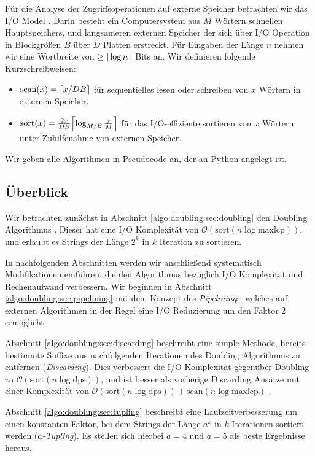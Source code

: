 Für die Analyse der Zugriffsoperationen auf externe Speicher betrachten wir das I/O Model \cite{Vitter1994}. Darin besteht ein Computersystem aus $M$ Wörtern schnellen Hauptspeichers, und langsameren externen Speicher der sich über I/O Operation in Blockgrößen $B$ über $D$ Platten erstreckt. Für Eingaben der Länge $n$ nehmen wir eine Wortbreite von $\geq \ceil*{\log n}$ Bits an. Wir definieren folgende Kurzschreibweisen:
\begin{itemize}
\item $\text{scan}(x) = \ceil*{x/DB}$ für sequentielles lesen oder schreiben von $x$ Wörtern in externen Speicher.
\item $\text{sort}(x) = \frac{2x}{DB}\ceil*{\log_{M/B}\frac{x}{M}}$ für das I/O-effiziente sortieren von $x$ Wörtern unter Zuhilfenahme von externen Speicher.
\end{itemize}

Wir geben alle Algorithmen in Pseudocode an, der an Python angelegt ist.

\subsection{Überblick}

Wir betrachten zunächst in Abschnitt \ref{algo:doubling:sec:doubling} den Doubling Algorithmus \cite{Arge1997}\cite{Crauser2002}. Dieser hat eine I/O Komplexität von $\mathcal{O}(\text{sort}(n \log \text{maxlcp}))$, und erlaubt es Strings der Länge $2^k$ in $k$ Iteration zu sortieren.

In nachfolgenden Abschnitten werden wir anschließend systematisch Modifikationen einführen, die den Algorithmus bezüglich I/O Komplexität und Rechenaufwand verbessern. Wir beginnen in Abschnitt \ref{algo:doubling:sec:pipelining} mit dem Konzept des \textit{Pipelining}s, welches auf externen Algorithmen in der Regel eine I/O Reduzierung um den Faktor 2 ermöglicht.

Abschnitt \ref{algo:doubling:sec:discarding} beschreibt eine simple Methode, bereits bestimmte Suffixe aus nachfolgenden Iterationen des Doubling Algorithmus zu entfernen (\textit{Discarding}). Dies verbessert die I/O Komplexität gegenüber Doubling zu $\mathcal{O}(\text{sort}(n \log \text{dps}))$, und ist besser als vorherige Discarding Ansätze mit einer Komplexität von $\mathcal{O}(\text{sort}(n \log \text{dps})) + \text{scan}(n \log \text{maxlcp})$ \cite{Crauser2002}.

Abschnitt \ref{algo:doubling:sec:tupling} beschreibt eine Laufzeitverbesserung um einen konstanten Faktor, bei dem Strings der Länge $a^k$ in $k$ Iterationen sortiert werden (\textit{$a$-Tupling}). Es stellen sich hierbei $a = 4$ und $a = 5$ als beste Ergebnisse heraus.


